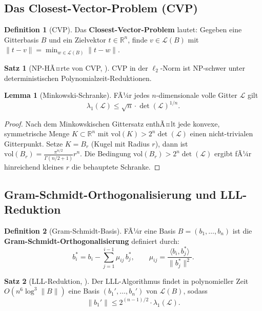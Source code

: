 ﻿\documentclass[a4paper,12pt]{article}
\theoremstyle{definition}
\newtheorem{definition}{Definition}[section]
\newtheorem{satz}{Satz}[section]
\newtheorem{lemma}{Lemma}[section]
\begin{document}
\subsection{Das Closest-Vector-Problem (CVP)}

\begin{definition}[CVP]
Das \textbf{Closest-Vector-Problem} lautet: Gegeben eine Gitterbasis $B$ und
ein Zielvektor $t \in \mathbb{R}^n$, finde $v \in \mathcal{L}(B)$ mit
$\|t - v\| = \min_{w \in \mathcal{L}(B)} \|t - w\|$.
\end{definition}

\begin{satz}[NP-HÃ¤rte von CVP, \cite{MG02}]
CVP in der $\ell_2$-Norm ist NP-schwer unter deterministischen Polynomialzeit-Reduktionen.
\end{satz}

\begin{lemma}[Minkowski-Schranke]
\label{lem:mink}
FÃ¼r jedes $n$-dimensionale volle Gitter $\mathcal{L}$ gilt
\[
  \lambda_1(\mathcal{L}) \leq \sqrt{n} \cdot \det(\mathcal{L})^{1/n}.
\]
\end{lemma}

\begin{proof}
Nach dem Minkowskischen Gittersatz enthÃ¤lt jede konvexe, symmetrische Menge
$K \subset \mathbb{R}^n$ mit $\mathrm{vol}(K) > 2^n \det(\mathcal{L})$ einen
nicht-trivialen Gitterpunkt. Setze $K = B_r$ (Kugel mit Radius $r$),
dann ist $\mathrm{vol}(B_r) = \frac{\pi^{n/2}}{\Gamma(n/2+1)} r^n$.
Die Bedingung $\mathrm{vol}(B_r) > 2^n \det(\mathcal{L})$ ergibt fÃ¼r hinreichend
kleines $r$ die behauptete Schranke.
\end{proof}

\subsection{Gram-Schmidt-Orthogonalisierung und LLL-Reduktion}

\begin{definition}[Gram-Schmidt-Basis]
FÃ¼r eine Basis $B = (b_1, \ldots, b_n)$ ist die
\textbf{Gram-Schmidt-Orthogonalisierung} definiert durch:
\[
  b_i^* = b_i - \sum_{j=1}^{i-1} \mu_{ij} \, b_j^*, \qquad
  \mu_{ij} = \frac{\langle b_i, b_j^* \rangle}{\|b_j^*\|^2}.
\]
\end{definition}

\begin{satz}[LLL-Reduktion, \cite{LLL82}]
Der LLL-Algorithmus findet in polynomieller Zeit $O(n^6 \log^3 \|B\|)$
eine Basis $(b_1', \ldots, b_n')$ von $\mathcal{L}(B)$, sodass
\[
  \|b_1'\| \leq 2^{(n-1)/2} \cdot \lambda_1(\mathcal{L}).
\]
\end{satz}
\end{document}
